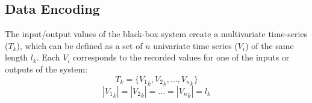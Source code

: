 

\subsection{Data Encoding}
The input/output values of the black-box system create a multivariate time-series ($T_k$), which can be defined as a set of $n$ univariate time series ($V_i$) of the same length $l_k$. Each $V_i$ corresponds to the recorded values for one of the inputs or outputs of the system:
\begin{equation} \label{eq:T_k}
    T_k = \{{V_1}_k, {V_2}_k, \ldots, {V_n}_k\}
\end{equation}
\begin{equation} \label{eq:l_k}
    |{V_1}_k|=|{V_2}_k|=\ldots=|{V_n}_k|=l_k 
\end{equation}

